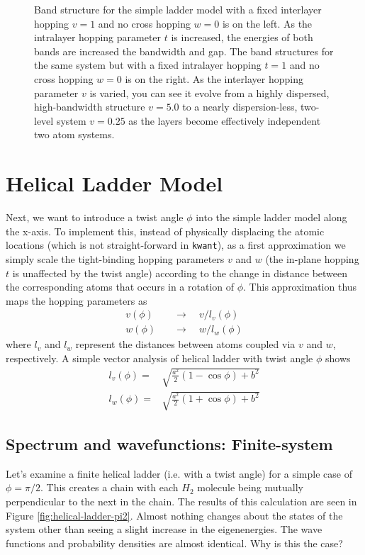 \documentclass{article}
\begin{document}
\begin{figure}[h]
    \caption{Band structure for the simple ladder model with a fixed interlayer hopping $v = 1$ and no cross hopping $w = 0$ is on the left. As the intralayer hopping parameter $t$ is increased, the energies of both bands are increased the bandwidth and gap. The band structures for the same system but with a fixed intralayer hopping $t = 1$ and no cross hopping $w = 0$ is on the right. As the interlayer hopping parameter $v$ is varied, you can see it evolve from a highly dispersed, high-bandwidth structure $v = 5.0$ to a nearly dispersion-less, two-level system $v=0.25$ as the layers become effectively independent two atom systems.}
    \label{fig:my_label}
\end{figure}

\section{Helical Ladder Model}
Next, we want to introduce a twist angle $\phi$ into the simple ladder model along the x-axis. To implement this, instead of physically displacing the atomic locations (which is not straight-forward in \verb|kwant|), as a first approximation we simply scale the tight-binding hopping parameters $v$ and $w$ (the in-plane hopping $t$ is unaffected by the twist angle) according to the change in distance between the corresponding atoms that occurs in a rotation of $\phi$. This approximation thus maps the hopping parameters as
\begin{align}
    v(\phi) &\quad\longrightarrow\quad v/l_v(\phi) \\
    w(\phi) &\quad\longrightarrow\quad w/l_w(\phi)
\end{align}
where $l_v$ and $l_w$ represent the distances between atoms coupled via $v$ and $w$, respectively. A simple vector analysis of helical ladder with twist angle $\phi$ shows
\begin{align}
    l_v(\phi) =& \sqrt{\frac{a^2}{2}(1-\cos\phi) + b^2} \\
    l_w(\phi) =& \sqrt{\frac{a^2}{2}(1+\cos\phi) + b^2}
\end{align}

\subsection{Spectrum and wavefunctions: Finite-system}
Let's examine a finite helical ladder (i.e. with a twist angle) for a simple case of $\phi = \pi/2$. This creates a chain with each $H_2$ molecule being mutually perpendicular to the next in the chain. The results of this calculation are seen in Figure \ref{fig:helical-ladder-pi2}. Almost nothing changes about the states of the system other than seeing a slight increase in the eigenenergies. The wave functions and probability densities are almost identical. Why is this the case?
\end{document}
